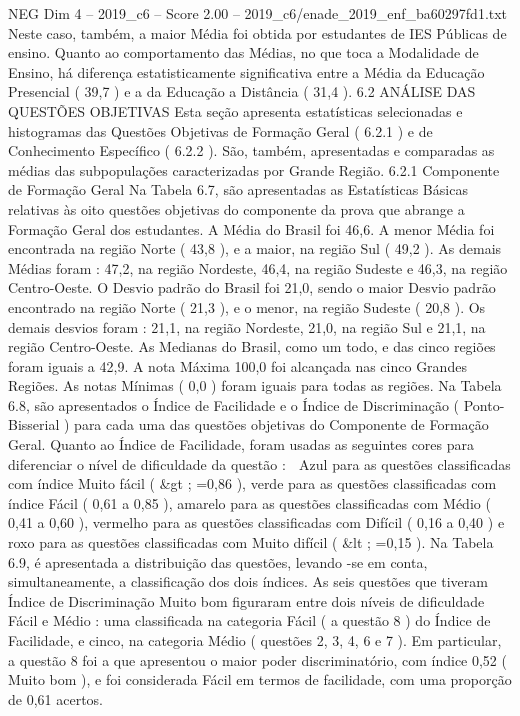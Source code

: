 \begin{textsample}{NEG Dim 4 – 2019\_c6 – Score 2.00 – 2019\_c6/enade\_2019\_enf\_ba60297fd1.txt}
Neste caso, também, a maior Média foi obtida por estudantes de IES Públicas de ensino.
Quanto ao comportamento das Médias, no que toca a Modalidade de Ensino, há diferença estatisticamente significativa entre a Média da Educação Presencial ( 39,7 ) e a da Educação a Distância ( 31,4 ). 6.2 ANÁLISE DAS QUESTÕES OBJETIVAS Esta seção apresenta estatísticas selecionadas e histogramas das Questões Objetivas de Formação Geral ( 6.2.1 ) e de Conhecimento Específico ( 6.2.2 ).
São, também, apresentadas e comparadas as médias das subpopulações caracterizadas por Grande Região. 6.2.1 Componente de Formação Geral Na Tabela 6.7, são apresentadas as Estatísticas Básicas relativas às oito questões objetivas do componente da prova que abrange a Formação Geral dos estudantes.
A Média do Brasil foi 46,6.
A menor Média foi encontrada na região Norte ( 43,8 ), e a maior, na região Sul ( 49,2 ).
As demais Médias foram : 47,2, na região Nordeste, 46,4, na região Sudeste e 46,3, na região Centro-Oeste.
O Desvio padrão do Brasil foi 21,0, sendo o maior Desvio padrão encontrado na região Norte ( 21,3 ), e o menor, na região Sudeste ( 20,8 ).
Os demais desvios foram : 21,1, na região Nordeste, 21,0, na região Sul e 21,1, na região Centro-Oeste.
As Medianas do Brasil, como um todo, e das cinco regiões foram iguais a 42,9.
A nota Máxima 100,0 foi alcançada nas cinco Grandes Regiões.
As notas Mínimas ( 0,0 ) foram iguais para todas as regiões.
Na Tabela 6.8, são apresentados o Índice de Facilidade e o Índice de Discriminação ( Ponto-Bisserial ) para cada uma das questões objetivas do Componente de Formação Geral.
Quanto ao Índice de Facilidade, foram usadas as seguintes cores para diferenciar o nível de dificuldade da questão :  Azul para as questões classificadas com índice Muito fácil ( \&gt ; =0,86 ), verde para as questões classificadas com índice Fácil ( 0,61 a 0,85 ), amarelo para as questões classificadas com Médio ( 0,41 a 0,60 ), vermelho para as questões classificadas com Difícil ( 0,16 a 0,40 ) e roxo para as questões classificadas com Muito difícil ( \&lt ; =0,15 ).
Na Tabela 6.9, é apresentada a distribuição das questões, levando -se em conta, simultaneamente, a classificação dos dois índices.
As seis questões que tiveram Índice de Discriminação Muito bom figuraram entre dois níveis de dificuldade Fácil e Médio : uma classificada na categoria Fácil ( a questão 8 ) do Índice de Facilidade, e cinco, na categoria Médio ( questões 2, 3, 4, 6 e 7 ).
Em particular, a questão 8 foi a que apresentou o maior poder discriminatório, com índice 0,52 ( Muito bom ), e foi considerada Fácil em termos de facilidade, com uma proporção de 0,61 acertos.

\end{textsample}
